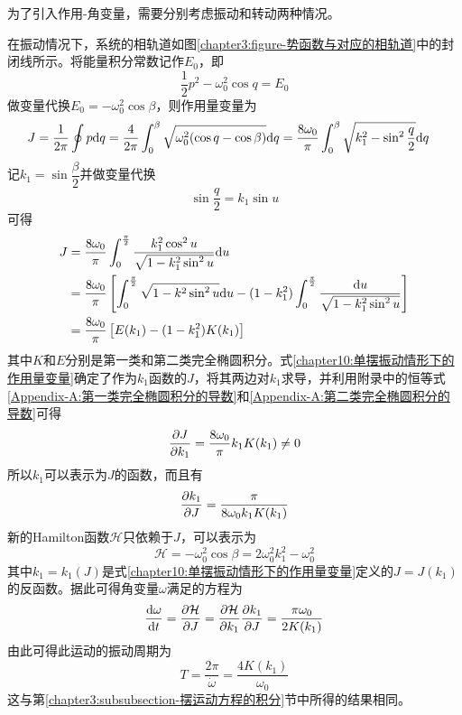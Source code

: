 为了引入作用-角变量，需要分别考虑振动和转动两种情况。

在振动情况下，系统的相轨道如图\ref{chapter3:figure-势函数与对应的相轨道}中的封闭线所示。将能量积分常数记作$E_0$，即
\begin{equation}
	\frac12 p^2 - \omega_0^2 \cos q = E_0
	\label{chapter10:摆运动的能量积分}
\end{equation}
做变量代换$E_0 = -\omega_0^2\cos \beta$，则作用量变量为
\begin{align*}
	J & = \frac{1}{2\pi} \oint p\mathrm{d} q = \frac{4}{2\pi} \int_0^\beta \sqrt{\omega_0^2(\cos q - \cos \beta)} \mathrm{d} q = \frac{8\omega_0}{\pi} \int_0^\beta \sqrt{k_1^2-\sin^2\frac q2}\mathrm{d} q
\end{align*}
记$k_1=\sin\dfrac{\beta}{2}$并做变量代换
\begin{equation}
	\sin\dfrac q2 = k_1\sin u
	\label{chapter10:单摆作用-角变量求解的变量代换}
\end{equation}
可得
\begin{align}
	J & = \frac{8\omega_0}{\pi} \int_0^{\frac{\pi}{2}} \frac{k_1^2\cos^2u}{\sqrt{1-k_1^2\sin^2u}} \mathrm{d} u \nonumber \\
	& = \frac{8\omega_0}{\pi} \left[\int_0^{\frac{\pi}{2}} \sqrt{1-k^2\sin^2u}\mathrm{d} u - (1-k_1^2) \int_0^{\frac{\pi}{2}} \frac{\mathrm{d} u}{\sqrt{1-k_1^2\sin^2u}}\right] \nonumber \\
	& = \frac{8\omega_0}{\pi} \left[E(k_1) - (1-k_1^2)K(k_1)\right] \label{chapter10:单摆振动情形下的作用量变量}
\end{align}
其中$K$和$E$分别是第一类和第二类完全椭圆积分。式\eqref{chapter10:单摆振动情形下的作用量变量}确定了作为$k_1$函数的$J$，将其两边对$k_1$求导，并利用附录中的恒等式\eqref{Appendix-A:第一类完全椭圆积分的导数}和\eqref{Appendix-A:第二类完全椭圆积分的导数}可得
\begin{equation}
	\frac{\partial J}{\partial k_1} = \frac{8\omega_0}{\pi}k_1K(k_1) \neq 0
\end{equation}
所以$k_1$可以表示为$J$的函数，而且有
\begin{equation}
	\frac{\partial k_1}{\partial J} = \frac{\pi}{8\omega_0k_1K(k_1)}
\end{equation}
新的Hamilton函数$\mathcal{H}$只依赖于$J$，可以表示为
\begin{equation}
	\mathcal{H} = -\omega_0^2\cos \beta = 2\omega_0^2k_1^2 - \omega_0^2
\end{equation}
其中$k_1=k_1(J)$是式\eqref{chapter10:单摆振动情形下的作用量变量}定义的$J=J(k_1)$的反函数。据此可得角变量$\omega$满足的方程为
\begin{equation}
	\dfrac{\mathrm{d} \omega}{\mathrm{d} t} = \frac{\partial \mathcal{H}}{\partial J} = \frac{\partial \mathcal{H}}{\partial k_1} \frac{\partial k_1}{\partial J} = \frac{\pi\omega_0}{2K(k_1)}
\end{equation}
由此可得此运动的振动周期为
\begin{equation}
	T = \frac{2\pi}{\dot{\omega}} = \frac{4K(k_1)}{\omega_0}
\end{equation}
这与第\ref{chapter3:subsubsection-摆运动方程的积分}节中所得的结果相同。

